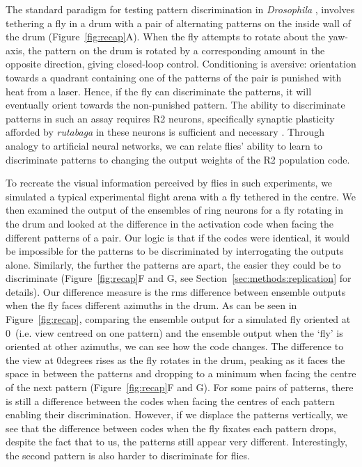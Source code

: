 The standard paradigm for testing pattern discrimination in \emph{Drosophila} \cite{Dill1993,Ernst1999,Liu2006,Pan2009}, involves tethering a fly in a drum with a pair of alternating patterns on the inside wall of the drum (Figure~\ref{fig:recap}A).
When the fly attempts to rotate about the yaw-axis, the pattern on the drum is rotated by a corresponding amount in the opposite direction, giving closed-loop control.
Conditioning is aversive: orientation towards a quadrant containing one of the patterns of the pair is punished with heat from a laser.
Hence, if the fly can discriminate the patterns, it will eventually orient towards the non-punished pattern. The ability to discriminate patterns in such an assay requires R2 neurons, specifically synaptic plasticity afforded by \emph{rutabaga} in these neurons is sufficient and necessary \cite{Ernst1999,Liu2006,Wang2008,Pan2009}. Through analogy to artificial neural networks, we can relate flies' ability to learn to discriminate patterns to changing the output weights of the R2 population code. 

To recreate the visual information perceived by flies in such experiments, we simulated a typical experimental flight arena with a fly tethered in the centre. We then examined the output of the ensembles of ring neurons for a fly rotating in the drum and looked at the difference in the activation code when facing the different patterns of a pair. Our logic is that if the codes were identical, it would be impossible for the patterns to be discriminated by interrogating the outputs alone. Similarly, the further the patterns are apart, the easier they could be to discriminate (Figure~\ref{fig:recap}F and G, see Section~\ref{sec:methods:replication} for details). Our difference measure is the \ac{rms} difference between ensemble outputs when the fly faces different azimuths in the drum. As can be seen in Figure~\ref{fig:recap}, comparing the ensemble output for a simulated fly oriented at 0\degree\ (i.e. view centreed on one pattern) and the ensemble output when the `fly' is oriented at other azimuths, we can see how the code changes. The difference to the view at 0degrees rises as the fly rotates in the drum, peaking as it faces the space in between the patterns and dropping to a minimum when facing the centre of the next pattern (Figure~\ref{fig:recap}F and G). For some pairs of patterns, there is still a difference between the codes when facing the centres of each pattern enabling their discrimination. However, if we displace the patterns vertically, we see that the difference between codes when the fly fixates each pattern drops, despite the fact that to us, the patterns still appear very different. Interestingly, the second pattern is also harder to discriminate for flies.

